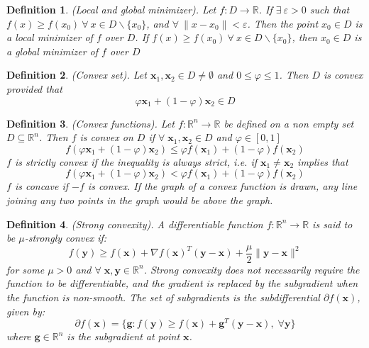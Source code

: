 \documentclass[12pt]{report}
\newtheorem{defn}{Definition}[section]
\numberwithin{equation}{section}
\begin{document}
\begin{defn} 
\normalfont
(Local and global minimizer).
Let $f:D \rightarrow \mathbb{R}$. If $\exists \  \varepsilon > 0$ such that  $f(x) \geq f(x_0) \  \forall \ x \in D\backslash \{x_0\}$, and $\forall \  \|x-x_0\|<\varepsilon$.  Then the point $x_0 \in D$ is a local minimizer of $f$ over $D$. If $f(x) \geq f(x_0) \  \forall \ x \in D\backslash \{x_0\}$, then  $x_0 \in D$ is a global minimizer of $f$ over $D$
\end{defn}
\begin{defn}
\normalfont
(Convex set).
Let $\bm{x}_1,\bm{x}_2 \in D \neq \emptyset$ and $0\leq \varphi \leq 1$. Then $D$ is convex provided that 
\[
\varphi \bm{x}_1 + (1-\varphi)\bm{x}_2 \in D 
\]
\end{defn}
\begin{defn}
\normalfont
(Convex functions).
Let $f:\mathbb{R}^n\rightarrow\mathbb{R}$ be defined on a non empty set $D\subseteq\mathbb{R}^n$. Then $f$ is convex on $D$ if $\forall \; \bm{x}_1,\bm{x}_2 \in D$ and $\varphi \in [0,1]$
\begin{equation}\label{eqn:convex_fxn}
f(\varphi \bm{x}_1 + (1-\varphi)\bm{x}_2) \leq \varphi f(\bm{x}_1) + (1-\varphi)f(\bm{x}_2)
\end{equation}
$f$ is strictly convex if the inequality is always strict, i.e. if $\bm{x}_1\neq \bm{x}_2$ implies that
\begin{equation}\label{eqn:convex_strict}
f(\varphi \bm{x}_1 + (1-\varphi)\bm{x}_2) < \varphi f(\bm{x}_1) + (1-\varphi)f(\bm{x}_2)
\end{equation}
$f$ is concave if $-f$ is convex. If the graph of a convex function is drawn, any line joining any two points in the graph would be above the graph. 
\end{defn}
\begin{defn}
\normalfont
(Strong convexity).
A differentiable function $f:\mathbb{R}^n\rightarrow\mathbb{R}$ is said to be $\mu$-strongly convex if:
\begin{equation}\label{eqn:strong_convex}
f(\bm{y}) \geq f(\bm{x}) + \nabla f(\bm{x})^T (\bm{y}-\bm{x}) + \frac{\mu}{2} \| \bm{y}-\bm{x} \|^2
\end{equation}
for some $\mu > 0$ and $\forall \; \bm{x},\bm{y} \in \mathbb{R}^n$. Strong convexity does not necessarily require the function to be differentiable, and the gradient is replaced by the subgradient when the function is non-smooth. The set of subgradients is the subdifferential $\partial f(\bm{x})$, given by: 
\begin{equation}\label{eqn:subgradient}
\partial f(\bm{x}) = \{\bm{g}: f(\bm{y}) \geq f(\bm{x})+ \bm{g}^T (\bm{y}-\bm{x}), \; \forall \bm{y}\}
\end{equation}
where $\bm{g} \in \mathbb{R}^n$ is the subgradient at point $\bm{x}$. 
\end{defn}
\end{document}
